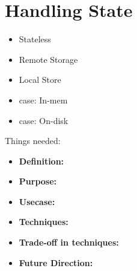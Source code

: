 \section{Handling State}
\label{sec:state}

\begin{itemize}
	\item  Stateless
	\item  Remote Storage
	\item  Local Store
	\item  case: In-mem
	\item case: On-disk
	
\end{itemize}

Things needed: 
\begin{itemize}
	\item \textbf{Definition: } 
	\item \textbf{Purpose: } 
	\item \textbf{Usecase:}
	\item \textbf{Techniques: }
	\item \textbf{Trade-off in techniques: } 
	\item \textbf{Future Direction:} 
\end{itemize}


